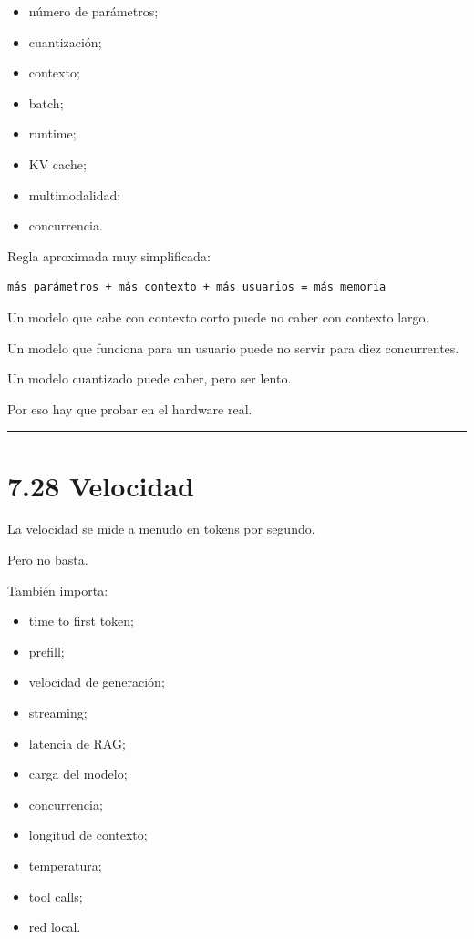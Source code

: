 \begin{itemize}
\tightlist
\item
  número de parámetros;
\item
  cuantización;
\item
  contexto;
\item
  batch;
\item
  runtime;
\item
  KV cache;
\item
  multimodalidad;
\item
  concurrencia.
\end{itemize}

Regla aproximada muy simplificada:

\begin{lstlisting}
más parámetros + más contexto + más usuarios = más memoria
\end{lstlisting}

Un modelo que cabe con contexto corto puede no caber con contexto largo.

Un modelo que funciona para un usuario puede no servir para diez
concurrentes.

Un modelo cuantizado puede caber, pero ser lento.

Por eso hay que probar en el hardware real.

\begin{center}\rule{0.5\linewidth}{0.5pt}\end{center}

\section{7.28 Velocidad}\label{velocidad-1}

La velocidad se mide a menudo en tokens por segundo.

Pero no basta.

También importa:

\begin{itemize}
\tightlist
\item
  time to first token;
\item
  prefill;
\item
  velocidad de generación;
\item
  streaming;
\item
  latencia de RAG;
\item
  carga del modelo;
\item
  concurrencia;
\item
  longitud de contexto;
\item
  temperatura;
\item
  tool calls;
\item
  red local.
\end{itemize}

